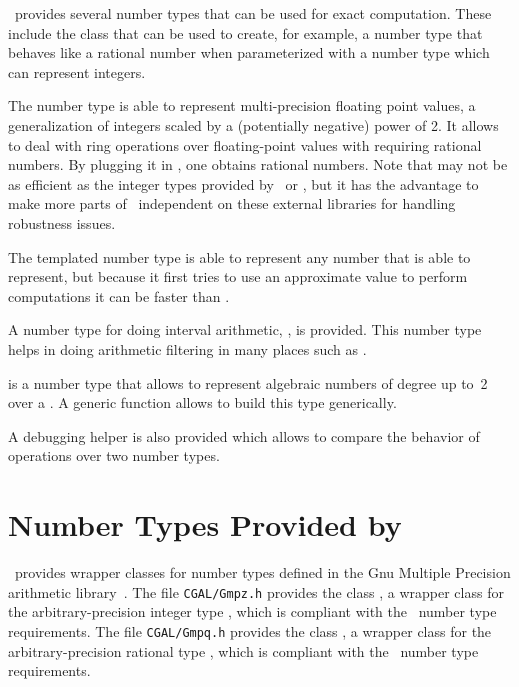 \cgal\ provides several number types that can be used for 
exact computation.  These include the  class that can
be used to create, for example, a number type that behaves like a rational
number when parameterized with a number type which can represent integers.

The number type  is able to represent multi-precision floating
point values, a generalization of integers scaled by a (potentially negative)
power of 2.  It allows to deal with ring operations over floating-point values
with requiring rational numbers.  By plugging it in , one obtains
rational numbers.  Note that  may not be as efficient as the
integer types provided by \gmp\  or \leda, but it has the advantage
to make more parts of \cgal\ independent on these external libraries for
handling robustness issues.

The templated number type  is able to represent any
number that  is able to represent, but because it first tries to use an
approximate value to perform computations it can be faster than .

A number type for doing interval arithmetic, , is provided.
This number type helps in doing arithmetic filtering in many places such
as .

 is a number type that allows to represent algebraic
numbers of degree up to~2 over a .  A generic function
 allows to build this type generically.

A debugging helper  is also
provided which allows to compare the behavior of operations over two number
types.

\section[Number Types Provided by GMP]{Number Types Provided by \gmp} 
\label{gmp-nt}

\cgal\ provides wrapper classes for number types defined in the {\sc
Gnu} Multiple Precision arithmetic library~\cite{g-ggmpa-}. The file
{\tt  CGAL/Gmpz.h} provides the class , a wrapper class for
the arbitrary-precision integer type , which is compliant
with the \cgal\ number type requirements. The file {\tt  CGAL/Gmpq.h}
provides the class , a wrapper class for the arbitrary-precision
rational type , which is compliant with the \cgal\ number
type requirements.

